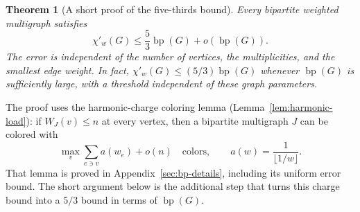\documentclass[11pt]{article}
\newtheorem{theorem}{Theorem}[section]
\theoremstyle{definition}\newtheorem{algorithm}{Algorithm}[section]
\numberwithin{equation}{section}
\theoremstyle{remark}\newtheorem*{remark}{Remark}
\newcommand{\bp}{\operatorname{bp}}
\begin{document}
\begin{theorem}[A short proof of the five-thirds bound]
\label{thm:bp-five-thirds-short}
Every bipartite weighted multigraph satisfies
\[
 \chi'_w(G)\le\frac53\bp(G)+o(\bp(G)).
\]
The error is independent of the number of vertices, the multiplicities,
and the smallest edge weight. In fact,
$\chi'_w(G)\le(5/3)\bp(G)$ whenever $\bp(G)$ is sufficiently large,
with a threshold independent of these graph parameters.
\end{theorem}

The proof uses the harmonic-charge coloring lemma
(Lemma~\ref{lem:harmonic-load}): if $W_J(v)\le n$ at every vertex, then
a bipartite multigraph $J$ can be colored with
\[
 \max_v\sum_{e\ni v}a(w_e)+o(n)
 \quad\text{colors},\qquad a(w)=\frac1{\lfloor1/w\rfloor}.
\]
That lemma is proved in Appendix~\ref{sec:bp-details}, including its
uniform error bound. The short argument below is the additional step
that turns this charge bound into a $5/3$ bound in terms of $\bp(G)$.
\end{document}
